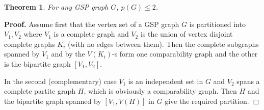 \documentclass[12pt]{article}
\newtheorem{theorem}{Theorem}%
\def\qed{\ifhmode\unskip\nobreak\fi\quad\ifmmode\Box\else$\Box$\fi}
\def\qed{\hfill $\Box$}
\begin{document}
\begin{theorem} \label{gensplit} For any GSP graph $G$, $p(G)\le 2$.
\end{theorem}

    {\bf Proof. } Assume first that the vertex set of a GSP graph $G$ is partitioned into $V_1,V_2$ where $V_1$
    is a complete graph and $V_2$ is the union of vertex disjoint complete graphs $K_i$ (with no edges between them).
    Then the complete subgraphs spanned by $V_1$ and by the $V(K_i)$-s form one comparability graph and the other is the bipartite graph
    $[V_1,V_2]$.

    In the second (complementary) case $V_1$ is an independent set in $G$ and $V_2$ spans a
    complete partite graph $H$, which is obviously a comparability graph.
    Then $H$ and the bipartite graph spanned by $[V_1,V(H)]$ in $G$ give the required partition.   \qed
\end{document}
